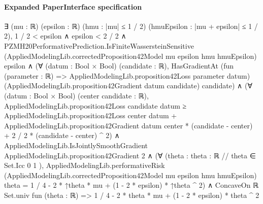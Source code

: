 \documentclass[10pt]{article}
\begin{document}
\paragraph{Expanded PaperInterface specification}
\begin{ReviewVerbatim}
∃ (mu : ℝ) (epsilon : ℝ) (hmu : |mu| ≤ 1 / 2) (hmuEpsilon : |mu + epsilon| ≤ 1 / 2),
  1 / 2 < epsilon ∧
    epsilon < 2 / 2 ∧
      PZMH20PerformativePrediction.IsFiniteWassersteinSensitive
          (AppliedModelingLib.correctedProposition42Model mu epsilon hmu hmuEpsilon) epsilon ∧
        (∀ (datum : Bool × Bool) (candidate : ℝ),
            HasGradientAt (fun (parameter : ℝ) => AppliedModelingLib.proposition42Loss parameter datum)
              (AppliedModelingLib.proposition42Gradient datum candidate) candidate) ∧
          (∀ (datum : Bool × Bool) (center candidate : ℝ),
              AppliedModelingLib.proposition42Loss candidate datum ≥
                AppliedModelingLib.proposition42Loss center datum +
                    AppliedModelingLib.proposition42Gradient datum center * (candidate - center) +
                  2 / 2 * (candidate - center) ^ 2) ∧
            AppliedModelingLib.IsJointlySmoothGradient AppliedModelingLib.proposition42Gradient 2 ∧
              (∀ (theta : { theta : ℝ // theta ∈ Set.Icc 0 1 }),
                  AppliedModelingLib.performativeRisk
                      (AppliedModelingLib.correctedProposition42Model mu epsilon hmu hmuEpsilon) theta =
                    1 / 4 - 2 * ↑theta * mu + (1 - 2 * epsilon) * ↑theta ^ 2) ∧
                ConcaveOn ℝ Set.univ fun (theta : ℝ) => 1 / 4 - 2 * theta * mu + (1 - 2 * epsilon) * theta ^ 2
\end{ReviewVerbatim}
\end{document}
